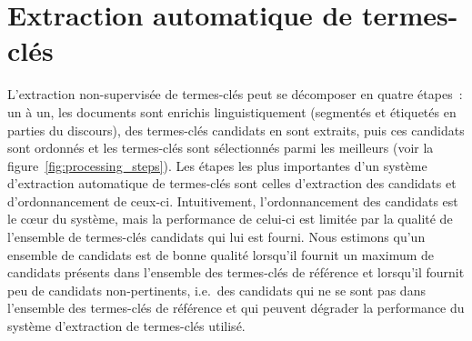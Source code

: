 \section{Extraction automatique de termes-clés}
\label{sec:extraction_automatique_de_termes_cles}
  L'extraction non-supervisée de termes-clés peut se décomposer en quatre
  étapes~: un à un, les documents sont enrichis linguistiquement (segmentés et
  étiquetés en parties du discours), des termes-clés candidats en sont extraits,
  puis ces candidats sont ordonnés et les termes-clés sont sélectionnés parmi
  les meilleurs (voir la figure~\ref{fig:processing_steps}). Les étapes les plus
  importantes d'un système d'extraction automatique de termes-clés sont celles
  d'extraction des candidats et d'ordonnancement de ceux-ci. Intuitivement,
  l'ordonnancement des candidats est le c\oe{}ur du système, mais la performance
  de celui-ci est limitée par la qualité de l'ensemble de termes-clés candidats
  qui lui est fourni. Nous estimons qu'un ensemble de candidats est de bonne
  qualité lorsqu'il fournit un maximum de candidats présents dans l'ensemble des
  termes-clés de référence et lorsqu'il fournit peu de candidats non-pertinents,
  i.e.~des candidats qui ne se sont pas dans l'ensemble des termes-clés de
  référence et qui peuvent dégrader la performance du système d'extraction de
  termes-clés utilisé.

